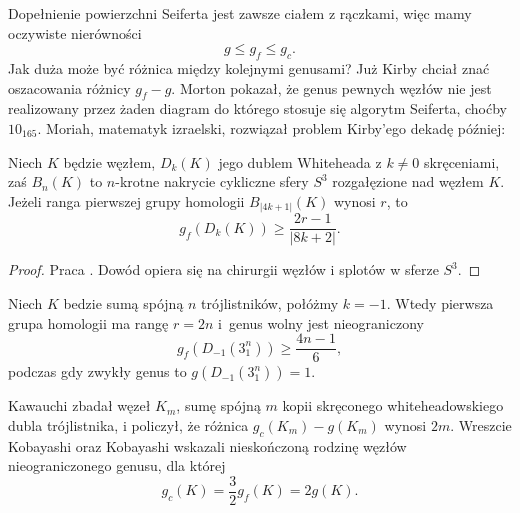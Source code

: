 Dopełnienie powierzchni Seiferta jest zawsze ciałem z rączkami, więc mamy oczywiste nierówności
\begin{equation}
    g \le g_f \le g_c.
\end{equation}
Jak duża może być różnica między kolejnymi genusami?
Już Kirby \cite[problem 1.20a]{kirby78} chciał znać oszacowania różnicy $g_f - g$.
Morton \cite{morton86} pokazał, że genus pewnych węzłów nie jest realizowany przez żaden diagram do którego stosuje się algorytm Seiferta, choćby $10_{165}$.
Moriah, matematyk izraelski, rozwiązał problem Kirby'ego dekadę później:

\begin{proposition}
    Niech $K$ będzie węzłem, $D_k(K)$ jego dublem Whiteheada z $k \neq 0$ skręceniami, zaś $B_n(K)$ to $n$-krotne nakrycie cykliczne sfery $S^3$ rozgałęzione nad węzłem $K$.
    Jeżeli ranga pierwszej grupy homologii $B_{|4k+1|}(K)$ wynosi $r$, to
    \begin{equation}
        g_f(D_k(K)) \ge \frac {2r-1} {|8k+2|}.
    \end{equation}
\end{proposition}

\begin{proof}
    Praca \cite{moriah87}.
    Dowód opiera się na chirurgii węzłów i splotów w sferze $S^3$.
\end{proof}

\begin{corollary}
    Niech $K$ bedzie sumą spójną $n$ trójlistników, połóżmy $k = -1$.
    Wtedy pierwsza grupa homologii ma rangę $r = 2n$ i~genus wolny jest nieograniczony
    \begin{equation}
        g_f(D_{-1}(3_1^n)) \ge \frac {4n-1} {6},
    \end{equation}
    podczas gdy zwykły genus to $g(D_{-1}(3_1^n)) = 1$.
\end{corollary}

Kawauchi \cite{kawauchi94} zbadał węzeł $K_m$, sumę spójną $m$ kopii skręconego whiteheadowskiego dubla trójlistnika, i policzył, że różnica $g_c(K_m) - g(K_m)$ wynosi $2m$.
Wreszcie Kobayashi oraz Kobayashi \cite{kobayashi96} wskazali nieskończoną rodzinę węzłów nieograniczonego genusu, dla której
\begin{equation}
    g_c(K) = \frac 32 g_f(K) = 2g(K).
\end{equation}


